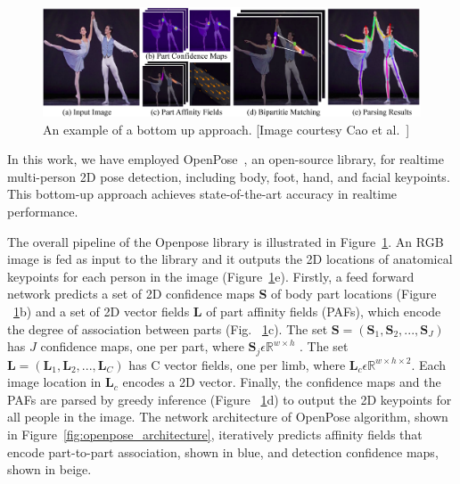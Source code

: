 \begin{figure}
	\centering
	\includegraphics[width=\textwidth]{figures/openpose_bottom_up.eps}
	\caption[An example of a bottom up approach]
	{An example of a bottom up approach. [Image courtesy Cao et al.~\cite{Cao_19}] \label{fig:openpose_bottom_up}}
\end{figure}

In this work, we have employed OpenPose~\cite{Cao_19}, an open-source library, for realtime multi-person 2D pose detection, including body, foot, hand, and facial keypoints. This bottom-up approach achieves state-of-the-art accuracy in realtime performance. 

The overall pipeline of the Openpose library is illustrated in Figure~\ref{fig:openpose_bottom_up}. An RGB image is fed as input to the library and it outputs the 2D locations of anatomical keypoints for each person in the image (Figure~\ref{fig:openpose_bottom_up}e). Firstly, a feed forward network predicts a set of 2D confidence maps \textbf{S} of body part locations (Figure ~\ref{fig:openpose_bottom_up}b) and a set of 2D vector fields \textbf{L} of part affinity fields (PAFs), which encode the degree of association between parts (Fig. ~\ref{fig:openpose_bottom_up}c). The set $\textbf{S} = (\textbf{S}_1,\textbf{S}_2,...,\textbf{S}_J)$ has $ J $ confidence maps, one per part, where $\textbf{S}_j \epsilon \mathbb {R}^{w\times h}$ . The set $\textbf{L}= (\textbf{L}_1,\textbf{L}_2,...,\textbf{L}_C)$ has C vector fields, one per limb, where $\textbf{L}_c \epsilon \mathbb {R}^{w\times h\times 2}$. Each image location in $\textbf{L}_c$ encodes a 2D vector. Finally, the confidence maps and the PAFs are parsed by greedy inference (Figure ~\ref{fig:openpose_bottom_up}d) to output the 2D keypoints for all people in the image. The network architecture of OpenPose algorithm, shown in Figure~\ref{fig:openpose_architecture}, iteratively predicts affinity fields  that  encode part-to-part association, shown in blue, and detection confidence  maps, shown in beige. 

